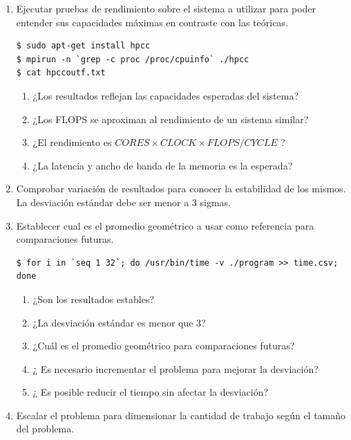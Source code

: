 \documentclass[a4paper]{report}
\begin{document}
\begin{enumerate}
\item Ejecutar pruebas de rendimiento sobre el sistema a utilizar para poder entender sus capacidades máximas en contraste con las teóricas.

\begin{lstlisting}[caption={Instalación de HPCC},label={lst:hpcc}]
$ sudo apt-get install hpcc
$ mpirun -n `grep -c proc /proc/cpuinfo` ./hpcc
$ cat hpccoutf.txt
\end{lstlisting}

\begin{enumerate}
\item ¿Los resultados reflejan las capacidades esperadas del sistema?
\item ¿Los FLOPS se aproximan al rendimiento de un sistema similar?
\item ¿El rendimiento es $ CORES \times CLOCK \times FLOPS/CYCLE $ ?
\item ¿La latencia y ancho de banda de la memoria es la esperada?
\end{enumerate}

\item Comprobar variación de resultados para conocer la estabilidad de los mismos. La desviación estándar debe ser menor a 3 sigmas. 
\item Establecer cual es el promedio geométrico a usar como referencia para comparaciones futuras.

\begin{lstlisting}[caption={Estabilidad de Resultados},label={lst:time}]
$ for i in `seq 1 32`; do /usr/bin/time -v ./program >> time.csv; done
\end{lstlisting}

\begin{enumerate}
\item ¿Son los resultados estables?
\item ¿La desviación estándar es menor que 3?
\item ¿Cuál es el promedio geométrico para comparaciones futuras?
\item ¿ Es necesario incrementar el problema para mejorar la desviación?
\item ¿ Es posible reducir el tiempo sin afectar la desviación?
\end{enumerate}

\item Escalar el problema para dimensionar la cantidad de trabajo según el tamaño del problema.


\end{enumerate}
\end{document}
